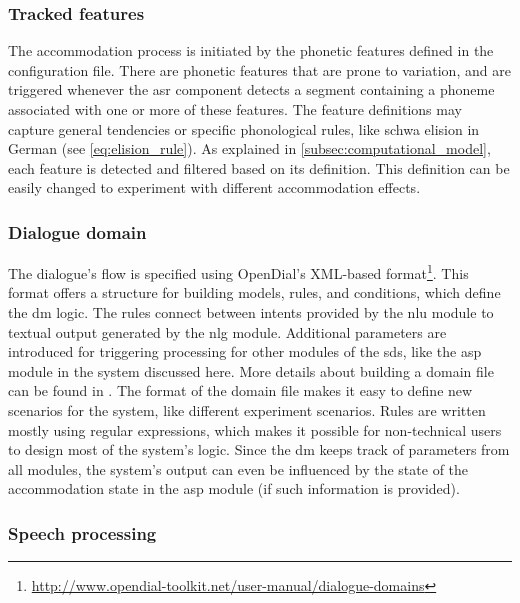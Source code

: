 \subsubsection{Tracked features}
\label{subsubsec:tracked_features}

The accommodation process is initiated by the phonetic features defined in the configuration file.
There are phonetic features that are prone to variation, and are triggered whenever the \ac{asr} component detects a segment containing a phoneme associated with one or more of these features.
The feature definitions may capture general tendencies or specific phonological rules, like schwa elision in German (see \cref{eq:elision_rule}).
As explained in \cref{subsec:computational_model}, each feature is detected and filtered based on its definition.
This definition can be easily changed to experiment with different accommodation effects.

\subsubsection{Dialogue domain}
\label{subsubsec:dialogue_domain}

The dialogue's flow is specified using OpenDial's XML-based format\footnote{\url{http://www.opendial-toolkit.net/user-manual/dialogue-domains}}.
This format offers a structure for building models, rules, and conditions, which define the \ac{dm} logic.
The rules connect between intents provided by the \ac{nlu} module to textual output generated by the \ac{nlg} module.
Additional parameters are introduced for triggering processing for other modules of the \ac{sds}, like the \ac{asp} module in the system discussed here.
More details about building a domain file can be found in \citet{Lison2016opendial}.
The format of the domain file makes it easy to define new scenarios for the system, like different experiment scenarios.
Rules are written mostly using regular expressions, which makes it possible for non-technical users to design most of the system's logic.
Since the \ac{dm} keeps track of parameters from all modules, the system's output can even be influenced by the state of the accommodation state in the \ac{asp} module (if such information is provided).

\subsubsection{Speech processing}
\label{subsubsec:speech_processing}

